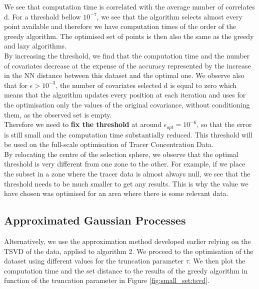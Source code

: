 We see that computation time is correlated with the average number of correlates d. For a threshold bellow $10^{-7}$, we see that the algorithm selects almost every point available and therefore we have computation times of the order of the greedy algorithm. The optimised set of points is then also the same as the greedy and lazy algorithms.\\

By increasing the threshold, we find that the computation time and the number of covariates decrease at the expense of the accuracy represented by the increase in the NN distance between this dataset and the optimal one. We observe also that for $\epsilon > 10^{-3}$, the number of covariates selected d is equal to zero which means that the algorithm updates every position at each iteration and uses for the optimisation only the values of the original covariance, without conditioning them, as the observed set is empty.  \\

Therefore we need to \textbf{fix the threshold} at around $ \epsilon_{opt} = 10^{-6}$, so that the error is still small and the computation time substantially reduced. This threshold will be used on the full-scale optimisation of Tracer Concentration Data.  \\ 


By relocating the centre of the selection sphere, we observe that the optimal threshold is very different from one zone to the other. For example, if we place the subset in a zone where the tracer data is almost always null, we see that the threshold needs to be much smaller to get any results. This is why the value we have chosen was optimised for an area where there is some relevant data. 


\subsection{Approximated Gaussian Processes}

Alternatively, we use the approximation method developed earlier relying on the TSVD of the data, applied to algorithm 2. We proceed to the optimisation of the dataset using different values for the truncation parameter $\tau$. We then plot the computation time and the set distance to the results of the greedy algorithm in function of the truncation parameter in Figure \ref{fig:small_set:tsvd}. \\

